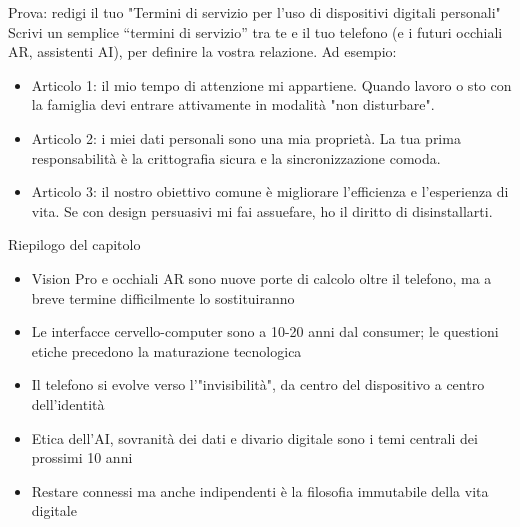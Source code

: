 \begin{tcbpractice}{Prova: redigi il tuo "Termini di servizio per l'uso di dispositivi digitali personali"}
Scrivi un semplice “termini di servizio” tra te e il tuo telefono (e i futuri occhiali AR, assistenti AI), per definire la vostra relazione. Ad esempio:

\begin{itemize}
  \item Articolo 1: il mio tempo di attenzione mi appartiene. Quando lavoro o sto con la famiglia devi entrare attivamente in modalità "non disturbare".
  \item Articolo 2: i miei dati personali sono una mia proprietà. La tua prima responsabilità è la crittografia sicura e la sincronizzazione comoda.
  \item Articolo 3: il nostro obiettivo comune è migliorare l'efficienza e l'esperienza di vita. Se con design persuasivi mi fai assuefare, ho il diritto di disinstallarti.
\end{itemize}

\end{tcbpractice}

\begin{tcbsummary}{Riepilogo del capitolo}
\begin{itemize}
  \item Vision Pro e occhiali AR sono nuove porte di calcolo oltre il telefono, ma a breve termine difficilmente lo sostituiranno
  \item Le interfacce cervello-computer sono a 10-20 anni dal consumer; le questioni etiche precedono la maturazione tecnologica
  \item Il telefono si evolve verso l'"invisibilità", da centro del dispositivo a centro dell'identità
  \item Etica dell'AI, sovranità dei dati e divario digitale sono i temi centrali dei prossimi 10 anni
  \item Restare connessi ma anche indipendenti è la filosofia immutabile della vita digitale
\end{itemize}

\end{tcbsummary}
